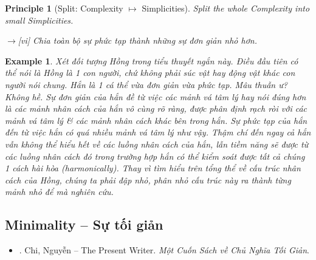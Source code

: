 \documentclass[12pt,oneside]{book}
\newtheorem{example}{Example}
\newtheorem{principle}{Principle}
\begin{document}
\begin{principle}[Split: Complexity $\mapsto$ Simplicities]
	Split the whole Complexity into small Simplicities.
	
	{\sf[en]$\to$[vi]} Chia toàn bộ sự phức tạp thành những sự đơn giản nhỏ hơn.
\end{principle}

\begin{example}
	Xét đối tượng {\sf Hồng} trong tiểu thuyết ngắn này. Điều đầu tiên có thể nói là {\sf Hồng} là 1 con người, chứ không phải súc vật hay động vật khác con người nói chung. Hắn là 1 cá thể vừa đơn giản vừa phức tạp. Mâu thuẫn ư? Không hề. Sự đơn giản của hắn đề từ việc các mảnh vá tâm lý hay nói đúng hơn là các mảnh nhân cách của hắn vô cùng rõ ràng, được phân định rạch ròi với các mảnh vá tâm lý \& các mảnh nhân cách khác bên trong hắn. Sự phức tạp của hắn đến từ việc hắn có quá nhiều mảnh vá tâm lý như vậy. Thậm chí đến ngay cả hắn vẫn không thể hiểu hết về các luồng nhân cách của hắn, lẫn tiềm năng sẽ được từ các luồng nhân cách đó trong trường hợp hắn có thể kiểm soát được tất cả chúng 1 cách hài hòa (harmonically). Thay vì tìm hiểu trên tổng thể về cấu trúc nhân cách của {\sf Hồng}, chúng ta phải đập nhỏ, phân nhỏ cấu trúc này ra thành từng mảnh nhỏ để mà nghiên cứu.
\end{example}

\subsection{Minimality -- Sự tối giản}
\begin{itemize}
	\item \cite{Chi2022}. {\sc Chi, Nguyễn -- The Present Writer}. {\it Một Cuốn Sách về Chủ Nghĩa Tối Giản}.
\end{itemize}
\end{document}
